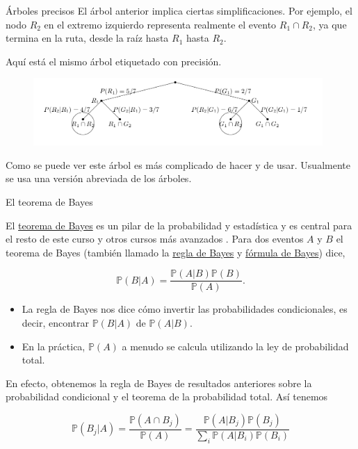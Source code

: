 \documentclass[10pt]{beamer}
\begin{document}
\begin{frame}{\'Arboles precisos}
El \'arbol anterior  implica ciertas simplificaciones. Por ejemplo, el nodo  $R_2$ en el extremo izquierdo representa realmente el evento $R_1 \cap R_2$, ya que termina en la ruta, desde la ra\'iz hasta $R_1$ hasta $R_2$.

Aqu\'i est\'a el mismo \'arbol  etiquetado con precisi\'on. 


\begin{figure}[h]
	\centering
	\includegraphics[width=11cm]{g6}
\end{figure}



Como se puede ver este \'arbol es m\'as complicado de hacer y de usar. Usualmente se usa una versi\'on  abreviada de los \'arboles.
\end{frame}

\begin{frame}{El teorema  de Bayes}
	
\small{El \underline{teorema de Bayes} es un pilar de la probabilidad y estad\'istica y es central para el resto de este curso y otros cursos m\'as avanzados . Para dos eventos $A$ y $B$ el teorema de Bayes (tambi\'en llamado la \underline{regla de Bayes} y \underline{f\'ormula de Bayes}) dice,

\[
\mathbb{P}(B|A) = \frac{\mathbb{P}(A|B)\mathbb{P}(B)}{\mathbb{P}(A)}.
\]

\begin{itemize}
	\item La regla de Bayes nos dice c\'omo invertir las probabilidades condicionales, es decir, encontrar $\mathbb{P}(B | A)$ de $\mathbb{P}(A | B)$.
\item En la pr\'actica, $\mathbb{P}(A)$ a menudo se calcula utilizando la ley de probabilidad total.

\end{itemize}
En efecto, obtenemos la regla de Bayes de resultados anteriores sobre la probabilidad condicional y el teorema de la probabilidad total. As\'i tenemos

\[
\mathbb{P}(B_j|A) = \frac{\mathbb{P}(A \cap B_j)}{\mathbb{P}(A)} = \frac{\mathbb{P}(A|B_j)\mathbb{P}(B_j)}{\sum_{i}\mathbb{P}(A|B_i)\mathbb{P}(B_i)}
\]
}
\end{frame}
\end{document}
